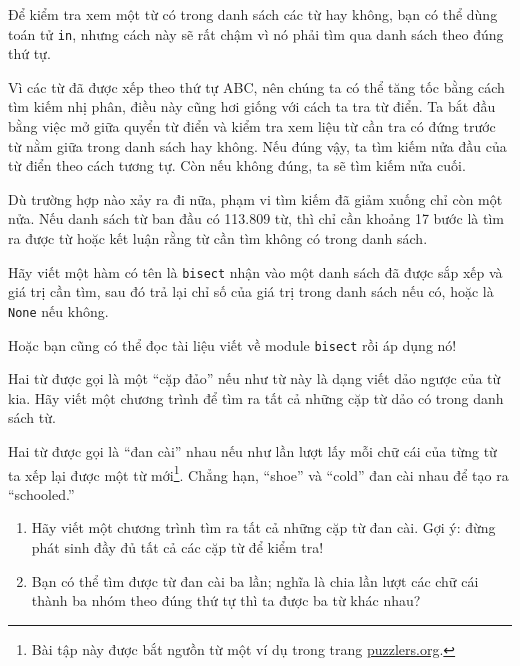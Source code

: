 \documentclass[11pt]{book}
\begin{document}
\begin{ex}
\label{wordlist1}
\label{bisection}


Để kiểm tra xem một từ có trong danh sách các từ hay không, bạn 
có thể dùng toán tử {\tt in}, nhưng cách này sẽ rất chậm vì nó phải tìm
qua danh sách theo đúng thứ tự.

Vì các từ đã được xếp theo thứ tự ABC, nên chúng ta có thể tăng tốc
bằng cách tìm kiếm nhị phân, điều này cũng hơi giống với cách ta tra
từ điển. Ta bắt đầu bằng việc mở giữa quyển từ điển và kiểm tra xem liệu
từ cần tra có đứng trước từ nằm giữa trong danh sách hay không. Nếu
đúng vậy, ta tìm kiếm nửa đầu của từ điển theo cách tương tự. Còn nếu
không đúng, ta sẽ tìm kiếm nửa cuối.

Dù trường hợp nào xảy ra đi nữa, phạm vi tìm kiếm đã giảm xuống
chỉ còn một nửa. Nếu danh sách từ ban đầu có 113.809 từ, thì chỉ cần
khoảng 17 bước là tìm ra được từ hoặc kết luận rằng từ cần tìm không
có trong danh sách.

Hãy viết một hàm có tên là {\tt bisect} nhận vào một danh sách đã được
sắp xếp và giá trị cần tìm, sau đó trả lại chỉ số của giá trị trong 
danh sách nếu có, hoặc là {\tt None} nếu không.


Hoặc bạn cũng có thể đọc tài liệu viết về module {\tt bisect} rồi
áp dụng nó!
\end{ex}

\begin{ex}

Hai từ được gọi là một ``cặp đảo'' nếu như từ này là dạng viết dảo 
ngược của từ kia. Hãy viết một chương trình để tìm ra tất cả những
cặp từ dảo có trong danh sách từ.
\end{ex}

\begin{ex}

Hai từ được gọi là ``đan cài'' nhau nếu như lần lượt lấy mỗi chữ cái
của từng từ ta xếp lại được một từ mới\footnote{Bài tập này được bắt ngưồn
từ một ví dụ trong trang \url{puzzlers.org}.}.  Chẳng hạn, ``shoe'' và ``cold''
đan cài nhau để tạo ra ``schooled.''

\begin{enumerate}

\item Hãy viết một chương trình tìm ra tất cả những cặp từ đan cài.
  Gợi ý: đừng phát sinh đầy đủ tất cả các cặp từ để kiểm tra!

\item Bạn có thể tìm được từ đan cài ba lần; nghĩa là chia lần lượt các chữ cái
  thành ba nhóm theo đúng thứ tự thì ta được ba từ khác nhau?

\end{enumerate}
\end{ex}
\end{document}
